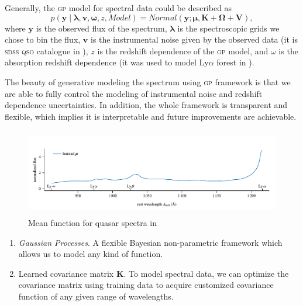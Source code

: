 \documentclass{ar-1col}
\begin{document}
Generally, the \textsc{gp} model for spectral data could be described as
\begin{equation}
    p( \mathbf{y} \mid \mathbf{\lambda}, \mathbf{v}, \mathbf{\omega}, z, Model ) 
    = Normal( \mathbf{y}; \mathbf{\mu}, \mathbf{K} + \mathbf{\Omega} + \mathbf{V} ), 
\end{equation}
where $\mathbf{y}$ is the observed flux of the spectrum, 
$\mathbf{\lambda}$ is the spectroscopic grids we chose to bin the flux, 
$\mathbf{v}$ is the instrumental noise given by the observed data (it is \textsc{sdss} \textsc{qso} catalogue \citep{SDSS09} in \citet{Garnett17}), $z$ is the redshift dependence of the \textsc{gp} model, and $\omega$ is the absorption redshift dependence (it was used to model
 Ly$\alpha$ forest in \citet{Garnett17}). 
 
 The beauty of generative modeling the spectrum using \textsc{gp} framework is that we are able to fully control the modeling of instrumental noise and redshift dependence uncertainties. 
 In addition, the whole framework is transparent and flexible, which implies it is interpretable and future improvements are achievable. 


\begin{figure}
    \includegraphics[width=5in, height=1.5in]{images/mean_function.pdf}
    \caption{Mean function for quasar spectra in \citet{Garnett17}}
    \label{fig:mean_function}
\end{figure}


\begin{summary}
    \begin{enumerate}
    \item \textit{Gaussian Processes}. A flexible Bayesian non-parametric framework which allows us to model any kind of function.
    \item Learned covariance matrix $\mathbf{K}$. To model spectral data, we can optimize the covariance matrix using training data to acquire customized covariance function of any given range of wavelengths.
    \end{enumerate}
\end{summary}
    
\end{document}
